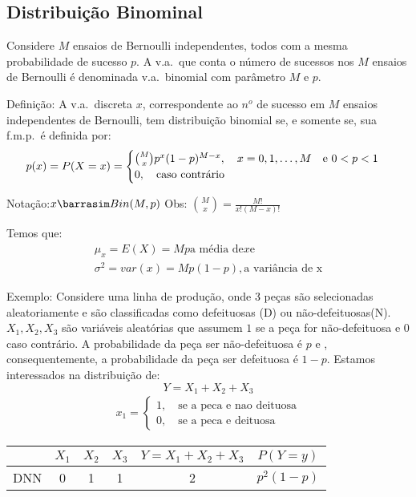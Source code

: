 \documentclass[11pt,a4paper]{book}
\begin{document}
 \subsection{Distribuição Binominal}
 Considere $M$ ensaios de Bernoulli independentes, todos com a mesma probabilidade
 de sucesso $p$. A v.a.\ que conta o número de sucessos nos $M$ ensaios de Bernoulli
 é denominada v.a.\ binomial com parâmetro $M$ e $p$.

 \begin{description}
   \item{Definição}: A v.a.\ discreta $x$, correspondente ao $n^o$ de sucesso em $M$ ensaios
     independentes de Bernoulli, tem distribuição binomial se, e somente se, sua 
     f.m.p.\ é definida por: 
     \begin{align}
       p(x)=P(X=x)=\begin{cases}
         \binom{M}{x}p^x (1-p)^{M-x}, \text{\quad}x=0,1,\dots,M \text{\quad e }0<p<1\\
         0, \text{\quad caso contrário}
       \end{cases}
     \end{align}

   \item{Notação}:$ x \barrasim Bin(M,p)\\$
     Obs: $\binom{M}{x}=\frac{M!}{x!(M-x)!}$

     Temos que: 
     \begin{align}
       \mu_{x}=E(X)=Mp\text{a média de} x \text{e}\\
       \sigma^2 =var(x)=Mp(1-p), \text{a variância de x}
     \end{align}
   \item{Exemplo}: Considere uma linha de produção, onde 3 peças são selecionadas aleatoriamente
     e são classificadas como defeituosas (D) ou não-defeituosas(N). $X_{1},X_{2},X_{3}$
     são variáveis aleatórias que assumem $1$ se a peça for não-defeituosa e $0$ caso 
     contrário. A probabilidade da peça ser não-defeituosa é $p$ e , consequentemente, 
     a probabilidade da peça ser defeituosa é $1-p$. Estamos interessados na distribuição
     de:
     $$Y=X_{1}+X_{2}+X_{3}$$
     \begin{align*}
       x_1 = \begin{cases}
         1, \quad \text{se a peca e nao deituosa}\\
         0, \quad \text{se a peca e deituosa}
       \end{cases}
     \end{align*}
     \begin{tabular}{c c c c c c }
       \toprule
       & $X_1$  & $X_2$ & $X_3$   & $Y= X_1 +X_2+ X_3$ & $ P(Y=y)$\\ \midrule
       DNN &0 & 1 & 1 & 2 & $p^2(1-p)$\\\midrule


\end{tabular}
\end{description}
\end{document}
